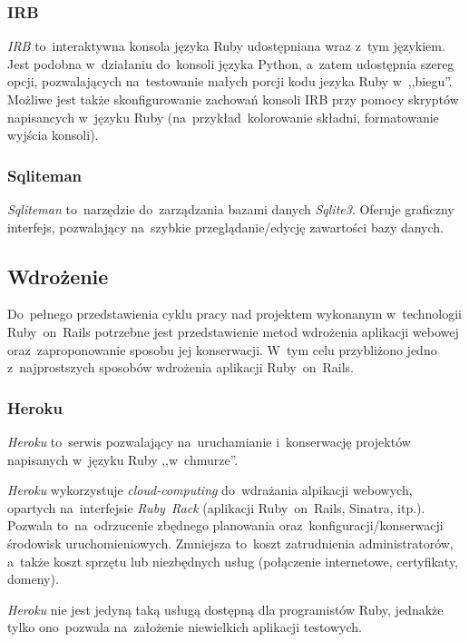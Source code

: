 \subsubsection{IRB}

\textit{IRB} to~interaktywna konsola języka Ruby udostępniana wraz z~tym językiem. Jest podobna w~działaniu do~konsoli języka Python, a~zatem udostępnia szereg opcji, pozwalających na~testowanie małych porcji kodu jezyka Ruby w~,,biegu''. Możliwe jest także skonfigurowanie zachowań konsoli IRB przy pomocy skryptów napisancych w~języku Ruby (na~przykład~kolorowanie składni, formatowanie wyjścia konsoli).

\subsubsection{Sqliteman}

\textit{Sqliteman} \cite{sqliteman} to~narzędzie do~zarządzania bazami danych \textit{Sqlite3}. Oferuje graficzny interfejs, pozwalający na~szybkie przeglądanie/edycję zawartości bazy danych.

\subsection{Wdrożenie}

Do~pełnego przedstawienia cyklu pracy nad projektem wykonanym w~technologii Ruby~on~Rails potrzebne jest przedstawienie metod wdrożenia aplikacji webowej oraz~zaproponowanie sposobu jej konserwacji. W~tym celu przybliżono jedno z~najprostszych sposobów wdrożenia aplikacji Ruby~on~Rails.

\subsubsection{Heroku}

\textit{Heroku} \cite{heroku} to~serwis pozwalający na~uruchamianie i~konserwację projektów napisanych w~języku Ruby ,,w~chmurze''.


\textit{Heroku} wykorzystuje \textit{cloud-computing} do~wdrażania alpikacji webowych, opartych na~interfejsie \textit{Ruby~Rack} (aplikacji Ruby~on~Rails, Sinatra, itp.). Pozwala to~na~odrzucenie zbędnego planowania oraz~konfiguracji/konserwacji środowisk uruchomieniowych. Zmniejsza to~koszt zatrudnienia administratorów, a~także koszt sprzętu lub niezbędnych usług (połączenie internetowe, certyfikaty, domeny).


\textit{Heroku} nie jest jedyną taką usługą dostępną dla programistów Ruby, jednakże tylko ono~pozwala na~założenie niewielkich aplikacji testowych.
